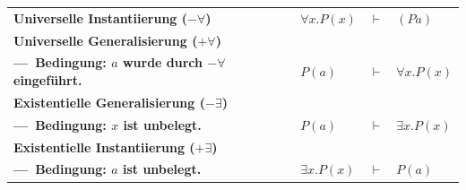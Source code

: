 \documentclass[10.5pt,oneside,a4paper]{paper}
\begin{document}
    \begin{tabular}[h]{p{}p{}cl}
      \textbf{Universelle Instantiierung ($-\forall$)}  & $\forall x.P(x)$ & $\vdash$ & $(Pa)$ \\
      \textbf{Universelle Generalisierung ($+\forall$)} &      &&   \\
      \textbf{---\ Bedingung: $a$ wurde durch $-\forall$ eingeführt.} & $P(a)$ & $\vdash$ & $\forall x.P(x)$\\
      \textbf{Existentielle Generalisierung ($-\exists$)} &&& \\
      \textbf{---\ Bedingung: $x$ ist unbelegt.} &  $P(a)$    & $\vdash$ & $\exists x.P(x)$ \\
      \textbf{Existentielle Instantiierung ($+\exists$)} &&& \\
      \textbf{---\ Bedingung: $a$ ist unbelegt.}  & $\exists x.P(x)$     & $\vdash$ & $P(a)$ \\
    \end{tabular}
\end{document}
